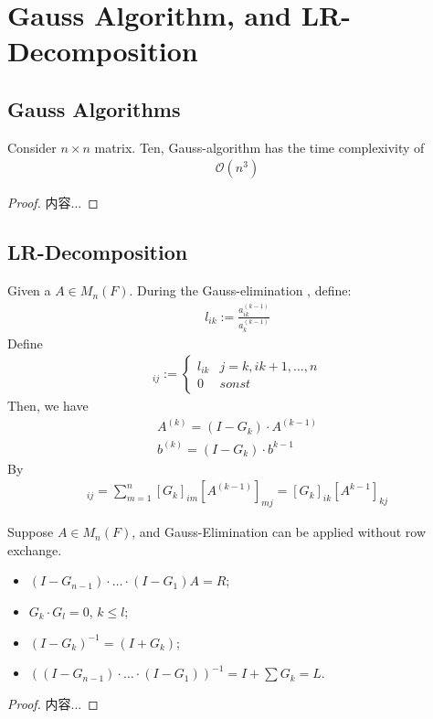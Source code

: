 \documentclass[Total.tex]{subfiles}
\begin{document}
		\section{Gauss Algorithm, and LR-Decomposition}
			\subsection{Gauss Algorithms}
				\begin{proposition}
					Consider $n\times n$ matrix. Ten, Gauss-algorithm has the time complexivity of
					\begin{gather*}
						\mathcal{O}(n^3)
					\end{gather*}
				\end{proposition}
				\begin{proof}
					内容...
				\end{proof}
			\subsection{LR-Decomposition}
				Given a $A\in M_n(F)$. During the Gauss-elimination , define:
				\begin{gather*}
					l_{ik}:=\frac{a_{ik}^{(k-1)}}{a_k^{(k-1)}}
				\end{gather*}
				Define
				\begin{gather*}
					[G_k]_{ij}:=\begin{cases}
						l_{ik}&j=k,ik+1,\dots,n\\
						0&sonst
					\end{cases}
				\end{gather*}
				Then, we have
				\begin{gather*}
					A^{(k)}=(I-G_k)\cdot A^{(k-1)}\\
					b^{(k)}=(I-G_k)\cdot b^{k-1}
				\end{gather*}
				By
				\begin{gather*}
					[G_k A^{(k-1)}]_{ij}=\sum_{m=1}^n [G_k]_{im}[A^{(k-1)}]_{mj}=[G_k]_{ik}[A^{k-1}]_{kj}
				\end{gather*}
				\begin{proposition}
					Suppose $A\in M_n(F)$, and Gauss-Elimination can be applied without row exchange. 
					\begin{itemize}
						\item $(I-G_{n-1})\cdot \dots \cdot (I-G_1)A=R$;
						\item $G_k\cdot G_l=0$, $k\leq l$;
						\item $(I-G_k)^{-1}=(I+G_k)$;
						\item $((I-G_{n-1})\cdot \dots \cdot (I-G_1))^{-1}=I+\sum G_k=L$.
					\end{itemize}
				\end{proposition}
				\begin{proof}
					内容...
				\end{proof}
				
\end{document}
